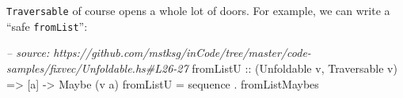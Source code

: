 \documentclass[]{article}
\newenvironment{Shaded}{}{}
\newcommand{\DataTypeTok}[1]{\textcolor[rgb]{0.56,0.13,0.00}{{#1}}}
\newcommand{\DecValTok}[1]{\textcolor[rgb]{0.25,0.63,0.44}{{#1}}}
\newcommand{\StringTok}[1]{\textcolor[rgb]{0.25,0.44,0.63}{{#1}}}
\newcommand{\CommentTok}[1]{\textcolor[rgb]{0.38,0.63,0.69}{\textit{{#1}}}}
\newcommand{\OtherTok}[1]{\textcolor[rgb]{0.00,0.44,0.13}{{#1}}}
\newcommand{\FunctionTok}[1]{\textcolor[rgb]{0.02,0.16,0.49}{{#1}}}
\newcommand{\NormalTok}[1]{{#1}}
\begin{document}
\begin{Shaded}
\end{Shaded}

\texttt{Traversable} of course opens a whole lot of doors. For example,
we can write a ``safe \texttt{fromList}'':

\begin{Shaded}
\begin{Highlighting}[]
\CommentTok{-- source: https://github.com/mstksg/inCode/tree/master/code-samples/fixvec/Unfoldable.hs#L26-27}
\OtherTok{fromListU ::} \NormalTok{(}\DataTypeTok{Unfoldable} \NormalTok{v, }\DataTypeTok{Traversable} \NormalTok{v) }\OtherTok{=>} \NormalTok{[a] }\OtherTok{->} \DataTypeTok{Maybe} \NormalTok{(v a)}
\NormalTok{fromListU }\FunctionTok{=} \NormalTok{sequence }\FunctionTok{.} \NormalTok{fromListMaybes}
\end{Highlighting}
\end{Shaded}
\end{document}
